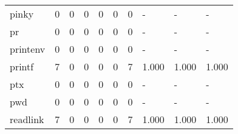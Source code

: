 \begin{longtable}{lp{1.3cm}p{1.3cm}p{1.3cm}p{1.3cm}p{1.3cm}p{1.3cm}p{1.3cm}p{1.3cm}p{1.3cm}}
pinky     &                      0 &                                  0 &                                 0 &                                0 &                                 0 &                               0 &                                    - &                                      - &                                    - \\
pr        &                      0 &                                  0 &                                 0 &                                0 &                                 0 &                               0 &                                    - &                                      - &                                    - \\
printenv  &                      0 &                                  0 &                                 0 &                                0 &                                 0 &                               0 &                                    - &                                      - &                                    - \\
printf    &                      7 &                                  0 &                                 0 &                                0 &                                 0 &                               7 &                                1.000 &                                  1.000 &                                1.000 \\
ptx       &                      0 &                                  0 &                                 0 &                                0 &                                 0 &                               0 &                                    - &                                      - &                                    - \\
pwd       &                      0 &                                  0 &                                 0 &                                0 &                                 0 &                               0 &                                    - &                                      - &                                    - \\
readlink  &                      7 &                                  0 &                                 0 &                                0 &                                 0 &                               7 &                                1.000 &                                  1.000 &                                1.000 \\

\end{longtable}
